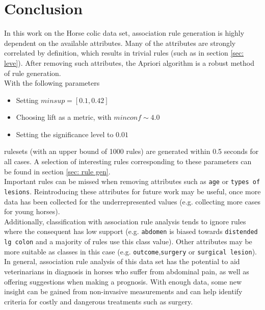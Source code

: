 \section{Conclusion}
In this work on the Horse colic data set, association rule generation is highly dependent on the available attributes.
Many of the attributes are strongly correlated by definition, which results in trivial rules (such as in section \ref{sec: leve}). After removing such attributes, the Apriori algorithm is a robust method of rule generation.\\

\noindent
With the following parameters
\begin{itemize}
\item Setting $minsup = \left[0.1, 0.42 \right]$
\item Choosing lift as a metric, with $minconf \sim 4.0$
\item Setting the significance level to $0.01$
\end{itemize}
rulesets (with an upper bound of 1000 rules) are generated within 0.5 seconds for all cases. A selection of  interesting rules corresponding to these parameters can be found in section \ref{sec: rule gen}.\\

\noindent
Important rules can be missed when removing attributes such as \verb|age| or \verb|types of lesions|. Reintroducing these attributes for future work may be useful, once more data has been collected for the underrepresented values (e.g. collecting more cases for young horses).\\

\noindent
Additionally, classification with association rule analysis tends to ignore rules where the consequent has low support (e.g. \verb|abdomen| is biased towards \verb|distended lg colon| and a majority of rules use this class value). Other attributes may be more suitable as classes in this case (e.g. \verb|outcome|,\verb|surgery| or \verb|surgical lesion|).\\

\noindent
In general, association rule analysis of this data set has the potential to aid veterinarians in diagnosis in horses who suffer from abdominal pain, as well as offering suggestions when making a prognosis. With enough data, some new insight can be gained from non-invasive measurements and can help identify criteria for costly and dangerous treatments such as surgery.